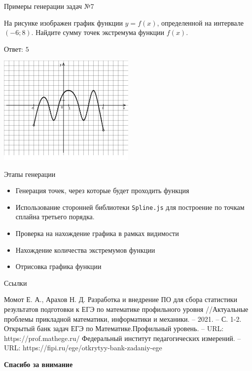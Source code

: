 \documentclass[aspectratio=169]{beamer}
\begin{document}
\begin{frame}{Примеры генерации задач №7}
    \begin{multicols}{2}
        На рисунке изображен график функции $y=f(x)$, определенной на интервале $(-6;8)$. Найдите сумму точек экстремума функции $f(x)$.

        Ответ: $5$

        \includegraphics[width=0.5\textwidth]{images/020693809529216n0}
    \end{multicols}
\end{frame}

\begin{frame}{Этапы генерации}
    \begin{itemize}
        \item Генерация точек, через которые будет проходить функция
        \item Использование сторонней библиотеки \texttt{Spline.js} для построение по точкам сплайна третьего порядка.
        \item Проверка на нахождение графика в рамках видимости %
        \item Нахождение количества экстремумов функции
        \item Отрисовка графика функции
    \end{itemize}
    
\end{frame}

\begin{frame}{Ссылки}
    \begin{thebibliography}{10}
         Момот Е. А., Арахов Н. Д. Разработка и внедрение ПО для сбора статистики результатов подготовки к ЕГЭ по математике профильного уровня //Актуальные проблемы прикладной математики, информатики и механики. – 2021. – С. 1-2.
        Открытый банк задач ЕГЭ по Математике.Профильный уровень. – URL:  https://prof.mathege.ru/
        Федеральный институт педагогических измерений. – URL:  https://fipi.ru/ege/otkrytyy-bank-zadaniy-ege
    \end{thebibliography}
\end{frame}

\begin{frame}
    \center
    \Large\textcolor{NordBrightBlue}{\textbf{Спасибо за внимание}}\\
\end{frame}
\end{document}

